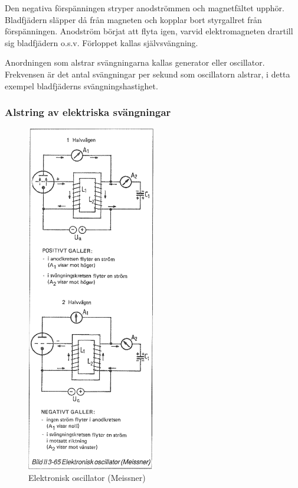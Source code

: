 Den negativa förspänningen stryper anodströmmen och magnetfältet
upphör. Bladfjädern släpper då från magneten och kopplar bort
styrgallret från förspänningen. Anodström börjat att flyta igen,
varvid elektromagneten drartill sig bladfjädern o.s.v. Förloppet
kallas självsvängning.

Anordningen som alstrar svängningarna kallas generator eller
oscillator. Frekvensen är det antal svängningar per sekund som
oscillatorn alstrar, i detta exempel bladfjäderns svängningshastighet.

\subsubsection{Alstring av elektriska svängningar}

\begin{figure}
\includegraphics[width=0.5\textwidth]{images/bild_2_3-65}
\caption{Elektronisk oscillator (Meissner)}
\label{fig:BildII3-65}
\end{figure}

